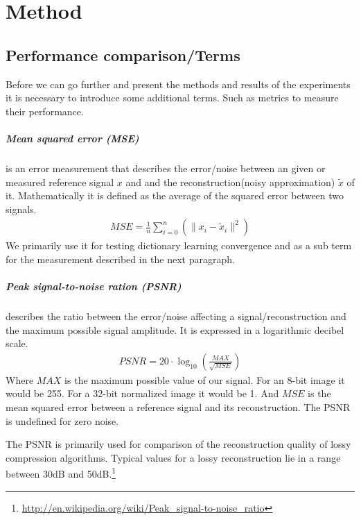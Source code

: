 \chapter{Method}

\section{Performance comparison/Terms}
Before we can go further and present the methods and results of the experiments
it is necessary to introduce some additional terms. 
Such as metrics to measure their performance.

\paragraph{Mean squared error (MSE)} is an error measurement that
describes the error/noise between an given or measured reference signal $x$
and  and the reconstruction(noisy approximation) $\tilde{x}$ of it.
Mathematically it is defined as the average of the squared error between two
signals.
\begin{align}
 MSE = \frac{1}{n} \sum_{i=0}^{n} \left( {\lVert x_i -
\tilde{x}_i\rVert^{2}}\right)
\end{align}
We primarily use it for testing dictionary learning convergence and as a
sub term for the measurement described in the next paragraph.

\paragraph{Peak signal-to-noise ration (PSNR)} describes the ratio between the
error/noise affecting a signal/reconstruction and the maximum possible signal
amplitude. It is expressed in a logarithmic decibel scale.
\begin{align}
 PSNR = 20 \cdot \log_{10} \left(\frac{MAX}{\sqrt{MSE}}\right)
\end{align}
Where $MAX$ is the maximum possible value of our signal. For an 8-bit
image it would be 255. For a 32-bit normalized image it would be 1. And $MSE$ is
the mean squared error between a reference signal and its reconstruction. The
PSNR is undefined for zero noise.

The PSNR is primarily used for comparison of the reconstruction quality of
lossy compression algorithms. Typical values for a lossy reconstruction lie in
a range between 30dB and
50dB.\footnote{\url{http://en.wikipedia.org/wiki/Peak_signal-to-noise_ratio}}


